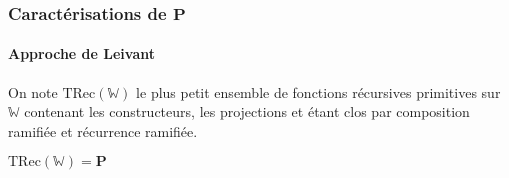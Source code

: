 \documentclass[10pt]{beamer}
\newcommand{\bbW}{\mathbb{W}}
\newcommand{\TRec}[1]{\text{TRec}\left(\mathbb{#1}\right)}
\newcommand{\TRecd}[1]{\text{TRec}_{2}\left(\mathbb{#1}\right)}
\begin{document}
%		
%		
%				
%				
%	
%	
	\begin{frame}
		\frametitle{Caractérisations de $\textbf{P}$}
		\framesubtitle{Approche de Leivant}
		
		\begin{defn}
			On note $\TRec{W}$ le plus petit ensemble de fonctions récursives primitives sur $\bbW$ contenant les constructeurs, les projections et étant clos par composition ramifiée et récurrence ramifiée.
			
		\end{defn}
		
		\pause
		
		\begin{thm}
			$\TRec{W} = \textbf{P}$ %
		\end{thm}
	\end{frame}
\end{document}
